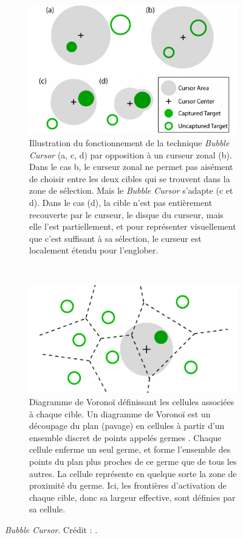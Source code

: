 	\begin{figure}[!htb]
		\begin{subfigure}[t]{0.49\textwidth}
			\centering
			\includegraphics[width=\textwidth]{figures/ch2/bubble}
			\caption{Illustration du fonctionnement de la technique \emph{Bubble Cursor} (a, c, d) par opposition à un curseur zonal (b). Dans le cas b, le curseur zonal ne permet pas aisément de choisir entre les deux cibles qui se trouvent dans la zone de sélection. Mais le \emph{Bubble Cursor} s'adapte (c et d). Dans le cas (d), la cible n'est pas entièrement recouverte par le curseur, le disque du curseur, mais elle l'est partiellement, et pour représenter visuellement que c'est suffisant à sa sélection, le curseur est localement étendu pour l'englober.}
			\label{fig:bubble}
		\end{subfigure}
		~
		\begin{subfigure}[t]{0.49\textwidth}
			\centering
			\includegraphics[width=\textwidth]{figures/ch2/voronoi}
			\caption{Diagramme de Voronoï définissant les cellules associées à chaque cible. Un diagramme de Voronoï est un découpage du plan (pavage) en cellules à partir d'un ensemble discret de points appelés \og germes \fg{}. Chaque cellule enferme un seul germe, et forme l'ensemble des points du plan plus proches de ce germe que de tous les autres. La cellule représente en quelque sorte la \og zone de proximité \fg{} du germe. Ici, les frontières d'activation de chaque cible, donc sa largeur effective, sont définies par sa cellule.}
			\label{fig:voronoi}
		\end{subfigure}
		\caption[\emph{Bubble Cursor}]{\emph{Bubble Cursor}. Crédit : \cite{grossman2005bubble}.}
		\label{fig:bubbleVoronoi}
	\end{figure}
	
